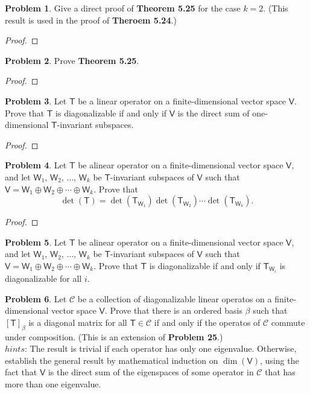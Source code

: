 \documentclass[12pt]{book}
\theoremstyle{definition}
\newtheorem{problem}{Problem}
\begin{document}
	\newpage
	\begin{problem}
		Give a direct proof of \textbf{Theorem 5.25} for the case $k=2$. (This result is used in the proof of \textbf{Theroem 5.24}.)
	\end{problem}
	\begin{proof}
	\end{proof}
	\newpage	
	\begin{problem}
		Prove \textbf{Theorem 5.25}.
	\end{problem}
	\begin{proof}
	\end{proof}
	\newpage
	\begin{problem}
		Let $\mathsf{T}$ be a linear operator on a finite-dimensional vector space $\mathsf{V}$. Prove that $\mathsf{T}$ is diagonalizable if and only if $\mathsf{V}$ is the direct sum of one-dimensional $\mathsf{T}$-invariant subspaces.
	\end{problem}
	\begin{proof}
	\end{proof}
	\newpage
	\begin{problem}
		Let $\mathsf{T}$ be alinear operator on a finite-dimensional vector space $\mathsf{V}$, and let $\mathsf{W}_1$, $\mathsf{W}_2$, $\ldots$, $\mathsf{W}_k$ be $\mathsf{T}$-invariant subspaces of $\mathsf{V}$ such that $\mathsf{V}=\mathsf{W}_1\oplus\mathsf{W}_2\oplus\cdots\oplus\mathsf{W}_k$. Prove that$$\det(\mathsf{T})=\det\left(\mathsf{T}_{\mathsf{W}_1}\right)\det\left(\mathsf{T}_{\mathsf{W}_2}\right)\cdots\det\left(\mathsf{T}_{\mathsf{W}_k}\right).$$
	\end{problem}
	\begin{proof}
	\end{proof}
	\newpage
	\begin{problem}
		Let $\mathsf{T}$ be alinear operator on a finite-dimensional vector space $\mathsf{V}$, and let $\mathsf{W}_1$, $\mathsf{W}_2$, $\ldots$, $\mathsf{W}_k$ be $\mathsf{T}$-invariant subspaces of $\mathsf{V}$ such that $\mathsf{V}=\mathsf{W}_1\oplus\mathsf{W}_2\oplus\cdots\oplus\mathsf{W}_k$. Prove that $\mathsf{T}$ is diagonalizable if and only if $\mathsf{T}_{\mathsf{W}_i}$ is diagonalizable for all $i$.
	\end{problem}
	\newpage
	\begin{problem}
		Let $\mathcal{C}$ be a collection of diagonalizable linear operatos on a finite-dimensional vector space $\mathsf{V}$. Prove that there is an ordered basis $\beta$ such that $[\mathsf{T}]_\beta$ is a diagonal matrix for all $\mathsf{T}\in\mathcal{C}$ if and only if the operatos of $\mathcal{C}$ commute under composition. (This is an extension of \textbf{Problem 25}.)\\
		$hints$: The result is trivial if each operator has only one eigenvalue. Otherwise, establish the general result by mathematical induction on $\dim(\mathsf{V})$, using the fact that $\mathsf{V}$ is the direct sum of the eigenspaces of some operator in $\mathcal{C}$ that has more than one eigenvalue.
	\end{problem}
\end{document}
